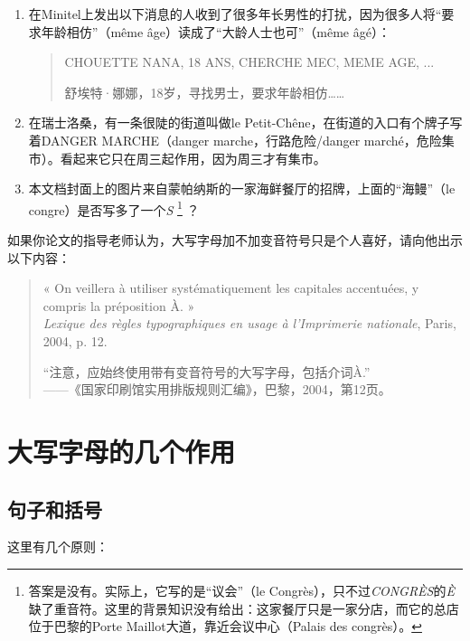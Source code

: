 \begin{enumerate}
    \item 在Minitel上发出以下消息的人收到了很多年长男性的打扰，因为很多人将“要求年龄相仿”（même âge）读成了“大龄人士也可”（même âgé）：
    \begin{quote}
        CHOUETTE NANA, 18 ANS, CHERCHE MEC, MEME AGE, ... 
        \begin{bil}
            舒埃特·娜娜，18岁，寻找男士，要求年龄相仿……
        \end{bil}
    \end{quote}
    \item 在瑞士洛桑，有一条很陡的街道叫做le Petit-Chêne，在街道的入口有个牌子写着DANGER MARCHE（danger marche，行路危险/danger marché，危险集市）。看起来它只在周三起作用，因为周三才有集市。
    \item 本文档封面上的图片来自蒙帕纳斯的一家海鲜餐厅的招牌，上面的“海鳗”（le congre）是否写多了一个\emph{S}%
        \footnote{答案是没有。实际上，它写的是“议会”（le Congrès），只不过\emph{CONGRÈS}的\emph{È}缺了重音符。这里的背景知识没有给出：这家餐厅只是一家分店，而它的总店位于巴黎的Porte Maillot大道，靠近会议中心（Palais des congrès）。}
    ？
\end{enumerate}

如果你论文的指导老师认为，大写字母加不加变音符号只是个人喜好，请向他出示以下内容：

\begin{quote}
    « On veillera à utiliser systématiquement les capitales accentuées, y compris la préposition À. »\\
    \emph{Lexique des règles typographiques en usage à l'Imprimerie nationale}, Paris, 2004, p. 12.
    \begin{bil}
        “注意，应始终使用带有变音符号的大写字母，包括介词À.”\\
        ——《国家印刷馆实用排版规则汇编》，巴黎，2004，第12页。
    \end{bil}
\end{quote}

\section{大写字母的几个作用}

\subsection{句子和括号}

这里有几个原则：

